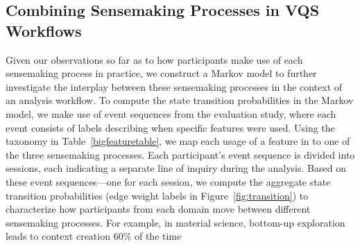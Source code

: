  \subsection{Combining Sensemaking Processes in VQS Workflows}
 Given our observations so far as to how participants make use of each sensemaking process in practice, we construct a Markov model to further investigate the interplay between these sensemaking processes in the context of an analysis workflow. %
 To compute the state transition probabilities in the Markov model, we make use of event sequences from the evaluation study, where each event consists of labels describing when specific features were used.
 Using the taxonomy in Table~\ref{bigfeaturetable}, we map each usage of a feature in \zvpp to one of the three sensemaking processes.
 Each participant's event sequence
 is divided into sessions,
 each indicating a separate line of inquiry
 during the analysis.
 Based on these event sequences---one for each session,
 we compute the aggregate state transition probabilities
 (edge weight labels in Figure~\ref{fig:transition})
 to characterize how participants from each domain
 move between different sensemaking processes.
 For example, in material science,
 bottom-up exploration
 leads to context creation 60\% of the time
